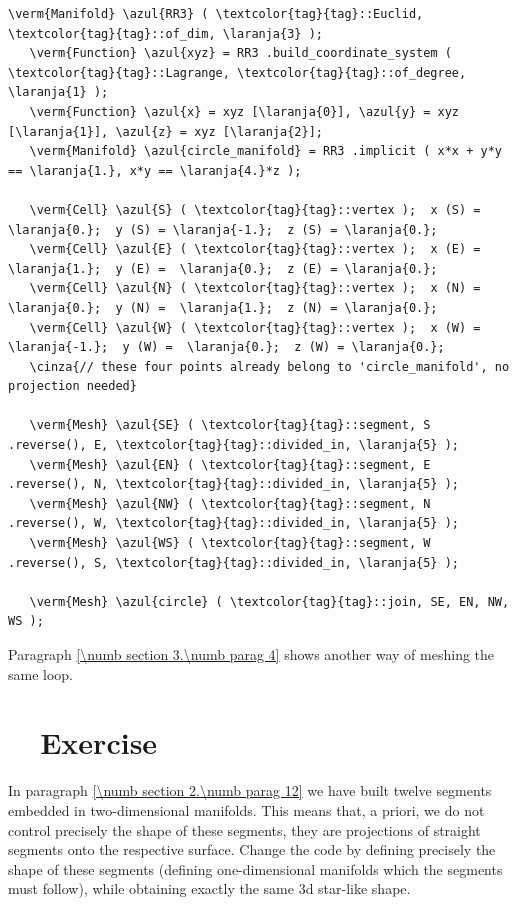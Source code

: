\begin{Verbatim}[commandchars=\\\{\},formatcom=\small\tt,frame=single,
   label=parag-\ref{\numb section 2.\numb parag 14}.cpp,rulecolor=\color{coment},
   baselinestretch=0.94,framesep=2mm]
   \verm{Manifold} \azul{RR3} ( \textcolor{tag}{tag}::Euclid, \textcolor{tag}{tag}::of_dim, \laranja{3} );
   \verm{Function} \azul{xyz} = RR3 .build_coordinate_system ( \textcolor{tag}{tag}::Lagrange, \textcolor{tag}{tag}::of_degree, \laranja{1} );
   \verm{Function} \azul{x} = xyz [\laranja{0}], \azul{y} = xyz [\laranja{1}], \azul{z} = xyz [\laranja{2}];
   \verm{Manifold} \azul{circle_manifold} = RR3 .implicit ( x*x + y*y == \laranja{1.}, x*y == \laranja{4.}*z );

   \verm{Cell} \azul{S} ( \textcolor{tag}{tag}::vertex );  x (S) =  \laranja{0.};  y (S) = \laranja{-1.};  z (S) = \laranja{0.};
   \verm{Cell} \azul{E} ( \textcolor{tag}{tag}::vertex );  x (E) =  \laranja{1.};  y (E) =  \laranja{0.};  z (E) = \laranja{0.};
   \verm{Cell} \azul{N} ( \textcolor{tag}{tag}::vertex );  x (N) =  \laranja{0.};  y (N) =  \laranja{1.};  z (N) = \laranja{0.};
   \verm{Cell} \azul{W} ( \textcolor{tag}{tag}::vertex );  x (W) = \laranja{-1.};  y (W) =  \laranja{0.};  z (W) = \laranja{0.};
   \cinza{// these four points already belong to 'circle_manifold', no projection needed}

   \verm{Mesh} \azul{SE} ( \textcolor{tag}{tag}::segment, S .reverse(), E, \textcolor{tag}{tag}::divided_in, \laranja{5} );
   \verm{Mesh} \azul{EN} ( \textcolor{tag}{tag}::segment, E .reverse(), N, \textcolor{tag}{tag}::divided_in, \laranja{5} );
   \verm{Mesh} \azul{NW} ( \textcolor{tag}{tag}::segment, N .reverse(), W, \textcolor{tag}{tag}::divided_in, \laranja{5} );
   \verm{Mesh} \azul{WS} ( \textcolor{tag}{tag}::segment, W .reverse(), S, \textcolor{tag}{tag}::divided_in, \laranja{5} );

   \verm{Mesh} \azul{circle} ( \textcolor{tag}{tag}::join, SE, EN, NW, WS );
\end{Verbatim}

Paragraph \ref{\numb section 3.\numb parag 4} shows another way of meshing the same loop.


\section{~~Exercise}\label{\numb section 2.\numb parag 15}

In paragraph \ref{\numb section 2.\numb parag 12} we have built twelve segments embedded in
two-dimensional manifolds.
This means that, a priori, we do not control precisely the shape of these segments,
they are projections of straight segments onto the respective surface.
Change the code by defining precisely the shape of these segments (defining one-dimensional
manifolds which the segments must follow), while obtaining exactly the same 3d star-like shape.


